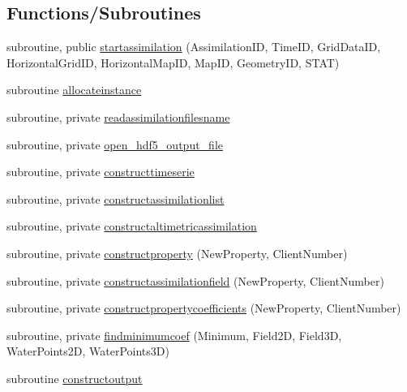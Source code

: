 \subsection*{Functions/\+Subroutines}
\begin{DoxyCompactItemize}
\item 
subroutine, public \mbox{\hyperlink{namespacemoduleassimilation_a686ae542667f0f0269fb4baa108cbcf7}{startassimilation}} (Assimilation\+ID, Time\+ID, Grid\+Data\+ID, Horizontal\+Grid\+ID, Horizontal\+Map\+ID, Map\+ID, Geometry\+ID, S\+T\+AT)
\item 
subroutine \mbox{\hyperlink{namespacemoduleassimilation_aad981de22073d1a61a32131d203265ca}{allocateinstance}}
\item 
subroutine, private \mbox{\hyperlink{namespacemoduleassimilation_a7409230e777bc5f92a43eb6fe78da6b9}{readassimilationfilesname}}
\item 
subroutine, private \mbox{\hyperlink{namespacemoduleassimilation_aaef927508148ef953ad8a480d4843ece}{open\+\_\+hdf5\+\_\+output\+\_\+file}}
\item 
subroutine, private \mbox{\hyperlink{namespacemoduleassimilation_ac14668590d74858a7daa3e19238d2a79}{constructtimeserie}}
\item 
subroutine, private \mbox{\hyperlink{namespacemoduleassimilation_a6f4678dd5995e947ccdc126f9abf9f6c}{constructassimilationlist}}
\item 
subroutine, private \mbox{\hyperlink{namespacemoduleassimilation_a26af0cc2dc6eb3e9e9dbefe2fb8c7b48}{constructaltimetricassimilation}}
\item 
subroutine, private \mbox{\hyperlink{namespacemoduleassimilation_af8bbe3b809fb38aac25e711c6dc7dc2e}{constructproperty}} (New\+Property, Client\+Number)
\item 
subroutine, private \mbox{\hyperlink{namespacemoduleassimilation_a458bfa1ab529ff7ecd2b6105aa5c04c3}{constructassimilationfield}} (New\+Property, Client\+Number)
\item 
subroutine, private \mbox{\hyperlink{namespacemoduleassimilation_a1af2e006a02d8457d8516853b6a03307}{constructpropertycoefficients}} (New\+Property, Client\+Number)
\item 
subroutine, private \mbox{\hyperlink{namespacemoduleassimilation_a9edf40407a0e79e84d746e6bf866bf17}{findminimumcoef}} (Minimum, Field2D, Field3D, Water\+Points2D, Water\+Points3D)
\item 
subroutine \mbox{\hyperlink{namespacemoduleassimilation_a0290dba29cfc2f2e50954134308fdd93}{constructoutput}}
\item 

\end{DoxyCompactItemize}
